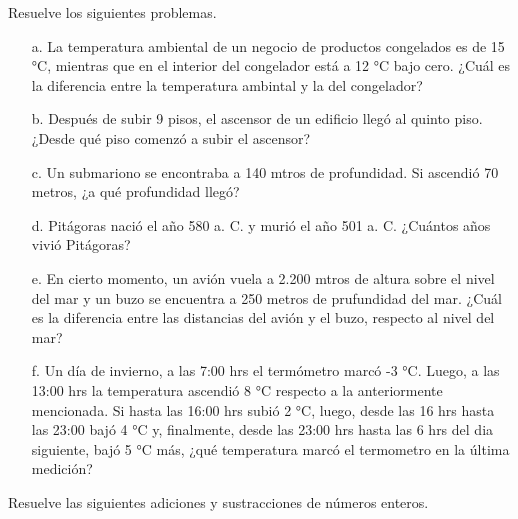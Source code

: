 \documentclass[spanish,letterpaper, 11pt, addpoints, answers]{exam}
\begin{document}
\begin{questions}
\begin{itemize}
\begin{center}
\begin{tabular}{|c|c|c|>{\centering\arraybackslash}p{3.5cm}|>{\centering\arraybackslash}p{3.5cm}|}
    
  \end{tabular}
\end{center}
\end{itemize}

\question Resuelve los siguientes problemas.

\begin{itemize}
  \item[a.] La temperatura ambiental de un negocio de productos congelados es de 15 °C, mientras que en el interior del congelador está a 12 °C bajo cero. ¿Cuál es la diferencia entre la temperatura ambintal y la del congelador?
  \vspace{2cm}
  \item[b.] Después de subir 9 pisos, el ascensor de un edificio llegó al quinto piso. ¿Desde qué piso comenzó a subir el ascensor?
  \vspace{2cm}
  \item[c.] Un submariono se encontraba a 140 mtros de profundidad. Si ascendió 70 metros, ¿a qué profundidad llegó?
  \vspace{2cm}
  \item[d.] Pitágoras nació el año 580 a. C. y murió el año 501 a. C. ¿Cuántos años vivió Pitágoras?
  \vspace{2cm}
  \item[e.] En cierto momento, un avión vuela a 2.200 mtros de altura sobre el nivel del mar y un buzo se encuentra a 250 metros de prufundidad del mar. ¿Cuál es la diferencia entre las distancias del avión y el buzo, respecto al nivel del mar?    
  \vspace{2cm}
  \item[f.] Un día de invierno, a las 7:00 hrs el termómetro marcó -3 °C. Luego, a las 13:00 hrs la temperatura ascendió 8 °C respecto a la anteriormente mencionada. Si hasta las 16:00 hrs subió 2 °C, luego, desde las 16 hrs hasta las 23:00 bajó 4 °C y, finalmente, desde las 23:00 hrs hasta las 6 hrs del dia siguiente, bajó 5 °C más, ¿qué temperatura marcó el termometro en la última medición? 
\end{itemize}

\question Resuelve las siguientes adiciones y sustracciones de números enteros.


\end{questions}
\end{document}
